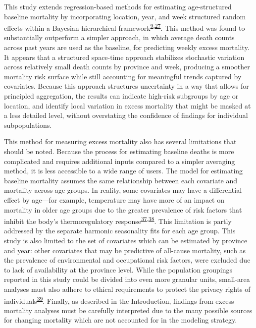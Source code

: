 \documentclass[
]{article}
\begin{document}
This study extends regression-based methods for estimating age-structured baseline mortality by incorporating location, year, and week structured random effects within a Bayesian hierarchical framework\textsuperscript{\protect\hyperlink{ref-Serfling1963}{9},\protect\hyperlink{ref-Ederer1961}{27}}⁠. This method was found to substantially outperform a simpler approach, in which average death counts across past years are used as the baseline, for predicting weekly excess mortality. It appears that a structured space-time approach stabilizes stochastic variation across relatively small death counts by province and week, producing a smoother mortality risk surface while still accounting for meaningful trends captured by covariates. Because this approach structures uncertainty in a way that allows for principled aggregation, the results can indicate high-risk subgroups by age or location, and identify local variation in excess mortality that might be masked at a less detailed level, without overstating the confidence of findings for individual subpopulations.

This method for measuring excess mortality also has several limitations that should be noted. Because the process for estimating baseline deaths is more complicated and requires additional inputs compared to a simpler averaging method, it is less accessible to a wide range of users. The model for estimating baseline mortality assumes the same relationship between each covariate and mortality across age groups. In reality, some covariates may have a differential effect by age---for example, temperature may have more of an impact on mortality in older age groups due to the greater prevalence of risk factors that inhibit the body's thermoregulatory response\textsuperscript{\protect\hyperlink{ref-Yu2010}{37},\protect\hyperlink{ref-Stafoggia2008}{38}}⁠. This limitation is partly addressed by the separate harmonic seasonality fits for each age group. This study is also limited to the set of covariates which can be estimated by province and year: other covariates that may be predictive of all-cause mortality, such as the prevalence of environmental and occupational risk factors, were excluded due to lack of availability at the province level. While the population groupings reported in this study could be divided into even more granular units, small-area analyses must also adhere to ethical requirements to protect the privacy rights of individuals\textsuperscript{\protect\hyperlink{ref-Bayer2000}{39}}⁠. Finally, as described in the Introduction, findings from excess mortality analyses must be carefully interpreted due to the many possible sources for changing mortality which are not accounted for in the modeling strategy.
\end{document}
